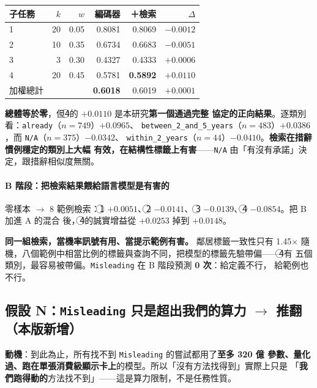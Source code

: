 \documentclass[11pt,a4paper]{ctexart}
\newcommand{\fn}[1]{\texttt{#1}}
\begin{document}
\begin{table}[h]
\centering\small
\begin{tabular}{@{}lrrrrr@{}}
\toprule
子任務 & $k$ & $w$ & 編碼器 & ＋檢索 & $\Delta$ \\
\midrule
\textcircled{1} & 20 & 0.05 & 0.8081 & 0.8069 & $-0.0012$ \\
\textcircled{2} & 10 & 0.35 & 0.6734 & 0.6683 & $-0.0051$ \\
\textcircled{3} & 3 & 0.30 & 0.4327 & 0.4333 & $+0.0006$ \\
\rowcolor{green!10}
\textcircled{4} & 20 & 0.45 & 0.5781 & \textbf{0.5892} & $\mathbf{+0.0110}$ \\
\midrule
加權總計 & & & \textbf{0.6018} & 0.6019 & $\mathbf{+0.0001}$ \\
\bottomrule
\end{tabular}
\end{table}

\textbf{總體等於零}，但\textcircled{4}的 $+0.0110$ 是本研究\textbf{第一個通過完整
協定的正向結果}。逐類別看：\fn{already}（$n=749$）$+0.0965$、
\fn{between\_2\_and\_5\_years}（$n=483$）$+0.0386$，而 \fn{N/A}（$n=375$）$-0.0342$、
\fn{within\_2\_years}（$n=44$）$-0.0410$。\textbf{檢索在措辭慣例穩定的類別上大幅
有效，在結構性標籤上有害}——\fn{N/A} 由「有沒有承諾」決定，跟措辭相似度無關。

\paragraph{B 階段：把檢索結果餵給語言模型是有害的}

零樣本 $\to$ 8 範例檢索：\textcircled{1} $+0.0051$、\textcircled{2} $-0.0141$、
\textcircled{3} $-0.0139$、\textcircled{4} $\mathbf{-0.0854}$。把 B 加進 A 的混合
後，\textcircled{4}的誠實增益從 $+0.0253$ 掉到 $+0.0148$。

\textbf{同一組檢索，當機率訊號有用、當提示範例有害。} 鄰居標籤一致性只有 1.45$\times$
隨機，八個範例中相當比例的標籤與查詢不同，把模型的標籤先驗帶偏——\textcircled{4}有
五個類別，最容易被帶偏。\fn{Misleading} 在 B 階段預測 \textbf{0 次}：給定義不行，
給範例也不行。

\subsection*{假設 N：\fn{Misleading} 只是超出我們的算力 $\to$ 推翻（本版新增）}

\textbf{動機}：到此為止，所有找不到 \fn{Misleading} 的嘗試都用了\textbf{至多 320 億
參數、量化過、跑在單張消費級顯示卡上}的模型。所以「沒有方法找得到」實際上只是
「\textbf{我們跑得動的}方法找不到」——這是算力限制，不是任務性質。
\end{document}
